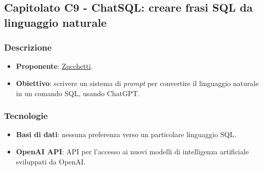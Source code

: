 \subsection{Capitolato C9 - ChatSQL: creare frasi SQL da linguaggio naturale}


\subsubsection{Descrizione}
\begin{itemize}
    \item \textbf{Proponente}: \href{https://www.zucchetti.it/website/cms/home.html}{Zucchetti}.
    \item \textbf{Obiettivo}: scrivere un sistema di \textit{prompt} per convertire il linguaggio naturale in un comando SQL, usando ChatGPT.
\end{itemize}


\subsubsection{Tecnologie}
\begin{itemize}
    \item \textbf{Basi di dati}: nessuna preferenza verso un particolare linguaggio SQL.
    \item \textbf{OpenAI API}: API per l'accesso ai nuovi modelli di intelligenza artificiale sviluppati da OpenAI.
\end{itemize}


